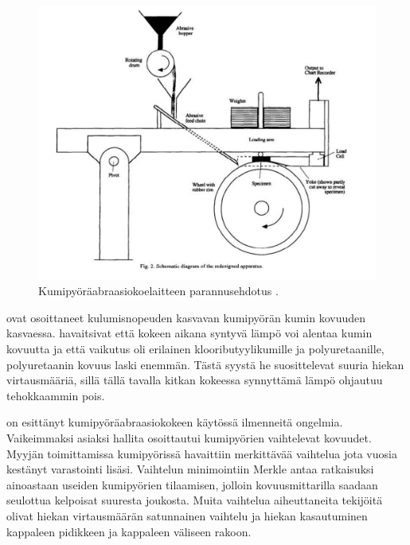 \documentclass[12pt,a4paper,finnish]{tutthesis}
\begin{document}
\begin{figure}
  \begin{center}
    \includegraphics[scale=0.6]{redesign}
  \end{center}
  \caption[Koelaitteen parannusehdotus]{Kumipyöräabraasiokoelaitteen parannusehdotus \parencite[s.~234]{Stevenson1996}.}
  \label{fig:redesign}
\end{figure}


\textcite{avery1981analysis,borik1970rubber} ovat osoittaneet kulumisnopeuden
kasvavan kumipyörän kumin kovuuden kasvaessa. \textcite{Stevenson1996}
havaitsivat että kokeen aikana syntyvä lämpö voi alentaa kumin kovuutta ja
että vaikutus oli erilainen klooributyylikumille ja polyuretaanille, polyuretaanin
kovuus laski enemmän. Tästä syystä he suosittelevat suuria hiekan virtausmääriä,
sillä tällä tavalla kitkan kokeessa synnyttämä lämpö ohjautuu tehokkaammin pois.

\textcite{merkle2008} on esittänyt kumipyöräabraasiokokeen
käytössä ilmenneitä ongelmia. Vaikeimmaksi asiaksi hallita
osoittautui kumipyörien vaihtelevat kovuudet. Myyjän toimittamissa
kumipyörissä havaittiin merkittävää vaihtelua jota vuosia kestänyt
varastointi lisäsi. Vaihtelun minimointiin Merkle antaa ratkaisuksi
ainoastaan useiden kumipyörien tilaamisen, jolloin kovuusmittarilla
saadaan seulottua kelpoisat suuresta joukosta. Muita vaihtelua aiheuttaneita
tekijöitä olivat hiekan virtausmäärän satunnainen vaihtelu ja
hiekan kasautuminen kappaleen pidikkeen ja kappaleen väliseen
rakoon.
\end{document}
